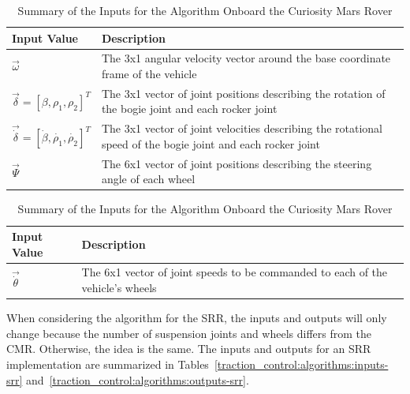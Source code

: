 \begin{table}[H]
	\centering
	\begin{tabular}{| >{\centering\arraybackslash} m{1.2in} | >{\centering\arraybackslash} m{4.5in} |}
		\hline
		\textbf{Input Value} & \textbf{Description} \\
		\hline
		$\vec{\omega}$ & The 3x1 angular velocity vector around the base coordinate frame of the vehicle \\
		\hline
		$\vec{\delta}=\left[\beta, \rho_{1}, \rho_{2}\right]^{T}$ & The 3x1 vector of joint positions describing the rotation of the bogie joint and each rocker joint \\
		\hline
		$\vec{\dot{\delta}}=\left[\dot{\beta}, \dot{\rho_{1}}, \dot{\rho_{2}}\right]^{T}$ & The 3x1 vector of joint velocities describing the rotational speed of the bogie joint and each rocker joint \\
		\hline
		$\vec{\Psi}$ & The 6x1 vector of joint positions describing the steering angle of each wheel \\
		\hline
	\end{tabular}
	\caption{Summary of the Inputs for the Algorithm Onboard the Curiosity Mars Rover}
	\label{traction_control:algorithms:inputs-cmr}
\end{table}

\begin{table}[H]
	\centering
	\begin{tabular}{| >{\centering\arraybackslash} m{1.2in} | >{\centering\arraybackslash} m{4.5in} |}
		\hline
		\textbf{Input Value} & \textbf{Description} \\
		\hline
		$\vec{\dot{\theta}}$ & The 6x1 vector of joint speeds to be commanded to each of the vehicle's wheels \\
		\hline
	\end{tabular}
	\caption{Summary of the Inputs for the Algorithm Onboard the Curiosity Mars Rover}
	\label{traction_control:algorithms:outputs-cmr}
\end{table}

When considering the algorithm for the \ac{SRR}, the inputs and outputs will only change because the number of suspension joints and wheels differs from the \ac{CMR}. Otherwise, the idea is the same. The inputs and outputs for an \ac{SRR} implementation are summarized in Tables~\ref{traction_control:algorithms:inputs-srr} and~\ref{traction_control:algorithms:outputs-srr}.

